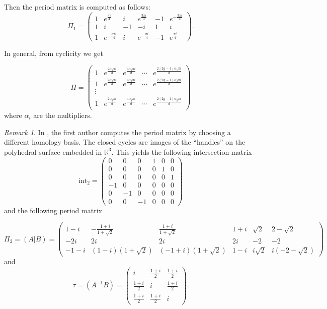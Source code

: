\documentclass[12pt,reqno]{amsart}
\newcommand{\R}{\mathbb{R}}
\theoremstyle{definition}
\theoremstyle{remark}
\newtheorem*{remark}{Remark}
\begin{document}
Then the period matrix is computed as follows: 
$$\Pi_1 = \left(
\begin{array}{cccccc}
 1 & e^{\frac{\pi i}{4}} & i & e^{\frac{3 \pi i}{4}} & -1 & e^{-\frac{3 \pi i}{4}} \\
 1 & i & -1 & -i & 1 & i \\
 1 & e^{-\frac{3 \pi i}{4}} & i & e^{-\frac{\pi i}{4}} & -1 & e^{\frac{\pi i}{4}} 
\end{array}
\right).$$


In general, from cyclicity we get 

$$\Pi = \left(
\begin{array}{ccccc}
 1 & e^{\frac{2 \alpha_1 \pi i}{d}} & e^{\frac{4 \alpha_1 \pi i}{d}} & \cdots & e^{\frac{2 (2 g - 1) \alpha_1 \pi i}{d}} \\
 1 & e^{\frac{2 \alpha_2 \pi i}{d}} & e^{\frac{4 \alpha_2 \pi i}{d}} & \cdots & e^{\frac{2 (2 g - 1) \alpha_2 \pi i}{d}} \\
 \vdots\\
 1 & e^{\frac{2 \alpha_g \pi i}{d}} & e^{\frac{4 \alpha_g \pi i}{d}} & \cdots & e^{\frac{2 (2 g - 1) \alpha_g \pi i}{d}} \\
\end{array}
\right)$$
where $\alpha_i$ are the multipliers.




\begin{remark} In \cite{dthesis}, the first author computes the period matrix by choosing a different homology basis. The closed cycles are images of the ``handles'' on the polyhedral surface embedded in $\R^3.$ This yields the following intersection matrix 
$$\textrm{int}_2 = \begin{pmatrix} 0 & 0 & 0 & 1 & 0 & 0 \\
 0 & 0 & 0 & 0 & 1 & 0 \\
 0 & 0 & 0 & 0 & 0 & 1 \\
 -1 & 0 & 0 & 0 & 0 & 0 \\
 0 & -1 & 0 & 0 & 0 & 0 \\
 0 & 0 & -1 & 0 & 0 & 0\end{pmatrix}$$ and the following period matrix

$$\Pi_2 = (A|B) = \begin{pmatrix}  1 - i& -\frac{1 + i}{1 + \sqrt{2}}& \frac{1 + i}{1 + \sqrt{2}}& 1 + i& \sqrt{2}& 2 - \sqrt{2} \\  -2i& 2i& 2i& 2i& -2& -2\\ -1 - i & (1 - i)(1 + \sqrt{2})& (-1 + i)(1 + \sqrt{2})& 1 - i& i\sqrt{2}& i(-2 - \sqrt{2})  \end{pmatrix} $$ and $$\tau = (A^{-1}B) = \begin{pmatrix}i & \frac{1 + i}{2} & \frac{1 + i}{2}\\
\frac{1 + i}{2} & i & \frac{1 + i}{2}\\
\frac{1 + i}{2} & \frac{1 + i}{2} & i\end{pmatrix}.$$
\end{remark}
\end{document}
